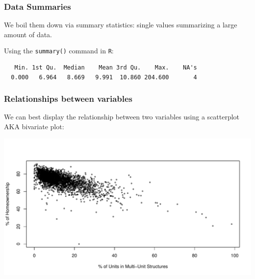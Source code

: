 \documentclass[slides]{beamer}
\newcommand{\blue}[1]{\textcolor{blue2}{#1}}
\begin{document}
\begin{frame}[fragile]
\frametitle{Data Summaries}
We boil them down via \blue{summary statistics}: single values summarizing a large amount of data.

\vspace{0.5cm}

\pause Using the \verb#summary()# command in \verb#R#:

\begin{small}
\begin{verbatim}
   Min. 1st Qu.  Median    Mean 3rd Qu.    Max.    NA's 
  0.000   6.964   8.669   9.991  10.860 204.600       4 
\end{verbatim}
\end{small}


\end{frame}


\begin{frame}[fragile]
\frametitle{Relationships between variables}
We can best display the relationship between two variables using a \blue{scatterplot AKA bivariate plot}:

\begin{center}
\pause\includegraphics[width=\linewidth]{figure/relationships} 
\end{center}

\end{frame}
\end{document}
